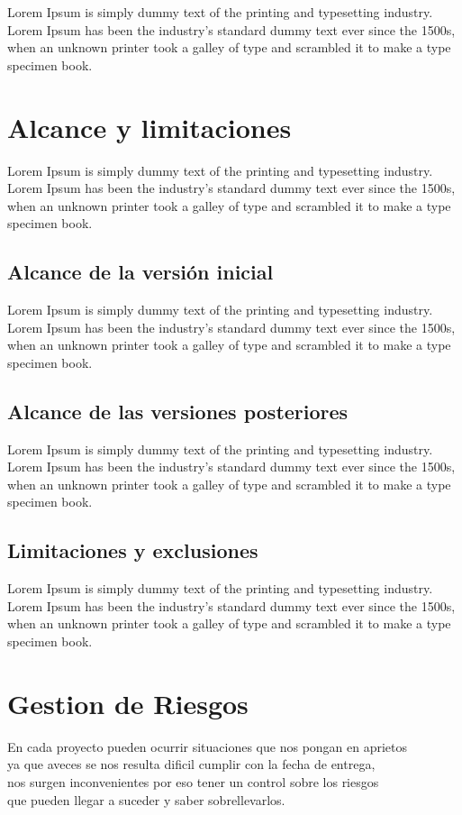 \documentclass[12pt]{article}
\begin{document}
Lorem Ipsum is simply dummy text of the printing and typesetting industry. Lorem Ipsum has been the industry's standard dummy text ever since the 1500s, when an unknown printer took a galley of type and scrambled it to make a type specimen book.

\section{Alcance y limitaciones}

Lorem Ipsum is simply dummy text of the printing and typesetting industry. Lorem Ipsum has been the industry's standard dummy text ever since the 1500s, when an unknown printer took a galley of type and scrambled it to make a type specimen book.
 
\subsection{Alcance de la versión inicial}\label{ant}

Lorem Ipsum is simply dummy text of the printing and typesetting industry. Lorem Ipsum has been the industry's standard dummy text ever since the 1500s, when an unknown printer took a galley of type and scrambled it to make a type specimen book.

\subsection{Alcance de las versiones posteriores}\label{on}

Lorem Ipsum is simply dummy text of the printing and typesetting industry. Lorem Ipsum has been the industry's standard dummy text ever since the 1500s, when an unknown printer took a galley of type and scrambled it to make a type specimen book.

\subsection{Limitaciones y exclusiones}\label{occe}

Lorem Ipsum is simply dummy text of the printing and typesetting industry. Lorem Ipsum has been the industry's standard dummy text ever since the 1500s, when an unknown printer took a galley of type and scrambled it to make a type specimen book.

\section{Gestion de Riesgos}
En cada proyecto pueden ocurrir situaciones que nos pongan en aprietos\\
ya que aveces se nos resulta dificil cumplir con la fecha de entrega,\\
nos surgen inconvenientes por eso tener un control sobre los riesgos\\
que pueden llegar a suceder y saber sobrellevarlos.\\ 
\end{document}
